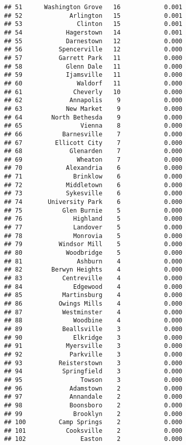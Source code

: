 \documentclass[]{article}
\begin{document}
\begin{verbatim}
## 51      Washington Grove   16            0.001
## 52             Arlington   15            0.001
## 53               Clinton   15            0.001
## 54            Hagerstown   14            0.001
## 55            Darnestown   12            0.000
## 56          Spencerville   12            0.000
## 57          Garrett Park   11            0.000
## 58            Glenn Dale   11            0.000
## 59            Ijamsville   11            0.000
## 60               Waldorf   11            0.000
## 61              Cheverly   10            0.000
## 62             Annapolis    9            0.000
## 63            New Market    9            0.000
## 64        North Bethesda    9            0.000
## 65                Vienna    8            0.000
## 66           Barnesville    7            0.000
## 67         Ellicott City    7            0.000
## 68             Glenarden    7            0.000
## 69               Wheaton    7            0.000
## 70            Alexandria    6            0.000
## 71              Brinklow    6            0.000
## 72            Middletown    6            0.000
## 73            Sykesville    6            0.000
## 74       University Park    6            0.000
## 75           Glen Burnie    5            0.000
## 76              Highland    5            0.000
## 77              Landover    5            0.000
## 78              Monrovia    5            0.000
## 79          Windsor Mill    5            0.000
## 80            Woodbridge    5            0.000
## 81               Ashburn    4            0.000
## 82        Berwyn Heights    4            0.000
## 83           Centreville    4            0.000
## 84              Edgewood    4            0.000
## 85           Martinsburg    4            0.000
## 86          Owings Mills    4            0.000
## 87           Westminster    4            0.000
## 88              Woodbine    4            0.000
## 89           Beallsville    3            0.000
## 90              Elkridge    3            0.000
## 91            Myersville    3            0.000
## 92             Parkville    3            0.000
## 93          Reisterstown    3            0.000
## 94           Springfield    3            0.000
## 95                Towson    3            0.000
## 96             Adamstown    2            0.000
## 97             Annandale    2            0.000
## 98             Boonsboro    2            0.000
## 99              Brooklyn    2            0.000
## 100         Camp Springs    2            0.000
## 101           Cooksville    2            0.000
## 102               Easton    2            0.000

\end{verbatim}
\end{document}
